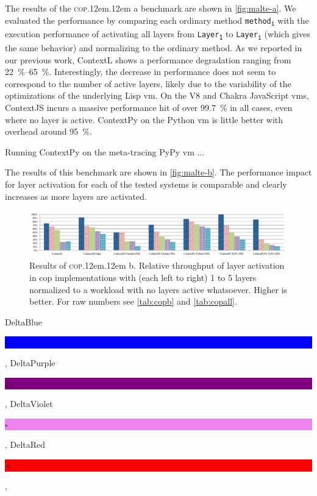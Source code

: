 \documentclass[preprint,english,10pt,nonatbib]{sigplanconf}
\DeclareRobustCommand*\copa{\textsc{cop}\kern .12em\oldstylenums{09}\kern .12em a\xspace}
\DeclareRobustCommand*\copb{\textsc{cop}\kern .12em\oldstylenums{09}\kern .12em b\xspace}
\begin{document}
The results of the \copa benchmark are shown in \autoref{fig:malte-a}. We evaluated
the performance by comparing each ordinary method \texttt{method\textsubscript{i}} with the
execution performance of activating all layers from \texttt{Layer\textsubscript{1}} to
\texttt{Layer\textsubscript{i}} (which gives the same behavior) and normalizing to the
ordinary method. As we reported in our previous work, ContextL shows a
performance degradation ranging from \SIrange{22}{65}{\percent}. Interestingly, the decrease
in performance does not seem to correspond to the number of active layers,
likely due to the variability of the optimizations of the underlying Lisp
\ac{vm}. On the V8 and Chakra JavaScript \acp{vm}, ContextJS incurs a massive
performance hit of over \SI{99.7}{\percent} in all cases, even where no layer is
active. ContextPy on the Python \ac{vm} is little better with overhead around
\SI{95}{\percent}.

Running ContextPy on the meta-tracing PyPy \ac{vm} ...



The results of this benchmark are shown in \autoref{fig:malte-b}. The
performance impact for layer activation for each of the tested systems is
comparable and clearly increases as more layers are activated.

\begin{figure}[htb]
  \centering
  \includegraphics[width=\linewidth]{bench/malte-b}
  \caption{Results of \copb. Relative throughput of layer activation in
  \protect\acs{cop} implementations with (each left to right) 1 to 5 layers
  normalized to a workload with no layers active whatsoever. Higher is better. For raw
  numbers see \autoref{tab:copb} and \autoref{tab:copall}.}
  \label{fig:malte-b}
\end{figure}

\def\idBox#1#2{%
\setlength{\fboxsep}{1pt}%
\colorbox{#1}{\textcolor[gray]{0.9}{\rule[0.1pt]{0pt}{5pt}#2}}%
\xspace}


DeltaBlue~\idBox{blue}{\(\circ\)}, %
DeltaPurple ~\idBox{purple}{\(\bigtriangleup\)}, %
DeltaViolet ~\idBox{violet}{\(\square\)}, %
DeltaRed~\idBox{red}{\(+\)}, %
\end{document}
